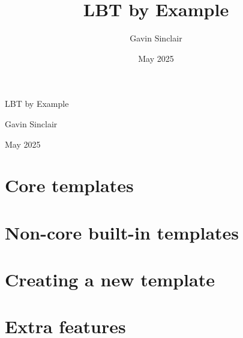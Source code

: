 \documentclass[12pt,oneside]{memoir}
\title{LBT by Example}
\author{Gavin Sinclair}
\date{May 2025}
\begin{document}

\frontmatter  %

\begin{titlingpage}
  \centering
  \vspace*{3cm}
  {\Huge LBT by Example\par}
  \vspace{1cm}
  {\large Gavin Sinclair\par}
  \vfill
  {\large May 2025\par}
\end{titlingpage}

\tableofcontents*
{}




\mainmatter   %

\part{Core templates}






\part{Non-core built-in templates}



\part{Creating a new template}

\part{Extra features}

\appendix

\backmatter
\end{document}
